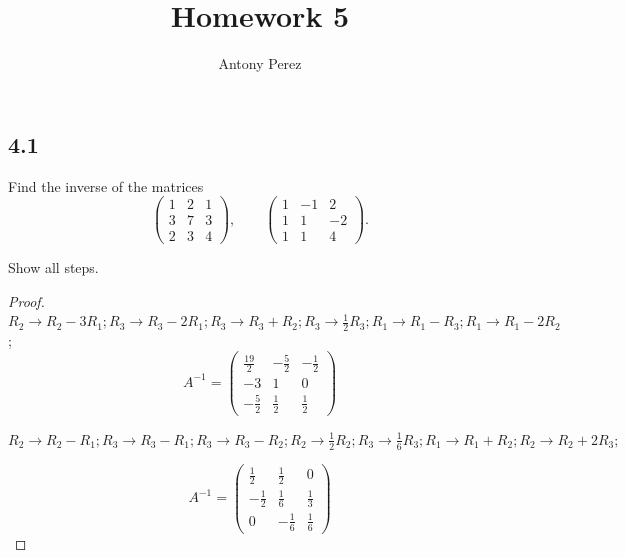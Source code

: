 \documentclass{amsart}
\title{Homework 5}
\author{Antony Perez}
\begin{document}
\maketitle
\subsection*{4.1}
Find the inverse of the matrices
\[
\begin{pmatrix}
1 & 2 & 1\\
3 & 7 & 3\\
2 & 3 & 4
\end{pmatrix},
\qquad
\begin{pmatrix}
1 & -1 & 2\\
1 & 1 & -2\\
1 & 1 & 4
\end{pmatrix}.
\]

Show all steps.
\begin{proof}
  $R_2 \to R_2 - 3R_1;
R_3 \to R_3 - 2R_1;
R_3 \to R_3 + R_2;
R_3 \to \tfrac{1}{2}R_3;
R_1 \to R_1 - R_3;
R_1 \to R_1 - 2R_2$;
\[
A^{-1} = \begin{pmatrix} \tfrac{19}{2} & -\tfrac{5}{2} & -\tfrac{1}{2} \\ -3 & 1 & 0 \\ -\tfrac{5}{2} & \tfrac{1}{2} & \tfrac{1}{2} \end{pmatrix}
\]

$R_2 \to R_2 - R_1;
R_3 \to R_3 - R_1;
R_3 \to R_3 - R_2;
R_2 \to \tfrac{1}{2}R_2;
R_3 \to \tfrac{1}{6}R_3;
R_1 \to R_1 + R_2;
R_2 \to R_2 + 2R_3;$

\[A^{-1} = \begin{pmatrix} \tfrac{1}{2} & \tfrac{1}{2} & 0 \\ -\tfrac{1}{2} & \tfrac{1}{6} & \tfrac{1}{3} \\ 0 & -\tfrac{1}{6} & \tfrac{1}{6} \end{pmatrix}\]
\end{proof}
\end{document}
